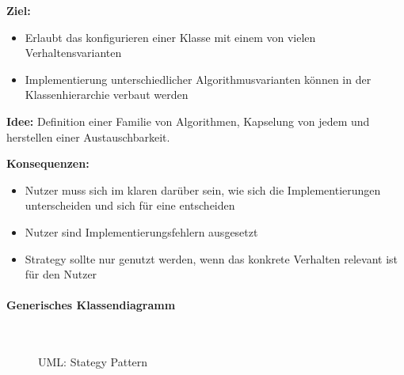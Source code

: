 \documentclass[ngerman,color=3b]{tuda_summary}
\begin{document}
\textbf{Ziel:}
\begin{itemize}
    \item Erlaubt das konfigurieren einer Klasse mit einem von vielen Verhaltensvarianten
    \item Implementierung unterschiedlicher Algorithmusvarianten können in der Klassenhierarchie verbaut werden
\end{itemize}

\textbf{Idee:} Definition einer Familie von Algorithmen, Kapselung von jedem und herstellen einer Austauschbarkeit.

\textbf{Konsequenzen:}
\begin{itemize}
    \item Nutzer muss sich im klaren darüber sein, wie sich die Implementierungen unterscheiden und sich für eine entscheiden
    \item Nutzer sind Implementierungsfehlern ausgesetzt
    \item Strategy sollte nur genutzt werden, wenn das konkrete Verhalten relevant ist für den Nutzer
\end{itemize}

\paragraph{Generisches Klassendiagramm}\mbox{}\\
\begin{figure}[ht]
    \centering
    \caption{UML: Stategy Pattern}
\end{figure}
\end{document}
